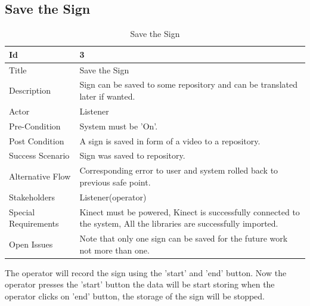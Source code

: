 \subsection{Save the Sign}
\begin{table}[htbp]
	\centering
	\caption{Save the Sign}
	\begin{tabular}{ |p{3cm}|p{11cm}| } 
		\hline
		 Id &  3  \\ 
		\hline
		 Title &  Save the Sign  \\ 
		\hline
		 Description &  Sign can be saved to some repository and can be translated later if wanted.  \\ 
		\hline
		 Actor & Listener \\
		\hline
		 Pre-Condition & System must be 'On'.  \\ 
		\hline
		 Post Condition &  A sign is saved in form of a video to a repository. \\ 
		\hline
		 Success Scenario &  Sign was saved to repository.  \\ 
		\hline
		 Alternative Flow &  Corresponding error to user and system rolled back to previous safe point.  \\ 
		\hline
		 Stakeholders &  Listener(operator)  \\ 
		\hline
		 Special Requirements &  Kinect must be powered,
		Kinect is successfully connected to the system,
		All the libraries are successfully imported. \\ 
		\hline
		 Open Issues &  Note that only one sign can be saved for the future work not more than one.  \\ 
		\hline
	\end{tabular}   
	
\end{table}
The operator will record the sign using the 'start' and 'end' button. Now the operator presses the 'start' button
the data will be start storing when the operator clicks on 'end' button, the storage of the sign will be stopped.   

\clearpage
